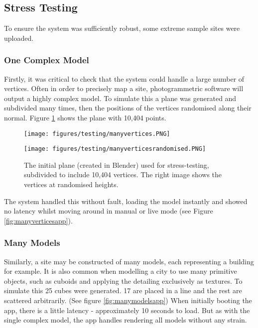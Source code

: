 \documentclass[12pt, a4paper]{article}
\begin{document}
\subsection{Stress Testing}
To ensure the system was sufficiently robust, some extreme sample sites were uploaded.

\subsubsection{One Complex Model}
Firstly, it was critical to check that the system could handle a large number of vertices. Often in order to precisely map a site, photogrammetric software will output a highly complex model. To simulate this a plane was generated and subdivided many times, then the positions of the vertices randomised along their normal. Figure \ref{fig:stressplane} shows the plane with 10,404 points.

\begin{figure}[H]
\centering
\begin{minipage}{.5\textwidth}
  \centering
  \texttt{[image: figures/testing/manyvertices.PNG]}
\end{minipage}%
\begin{minipage}{.5\textwidth}
  \centering
  \texttt{[image: figures/testing/manyverticesrandomised.PNG]}
\end{minipage}
\caption{The initial plane (created in Blender) used for stress-testing, subdivided to include 10,404 vertices. The right image shows the vertices at randomised heights.}
\label{fig:stressplane}
\end{figure}

The system handled this without fault, loading the model instantly and showed no latency whilst moving around in manual or live mode (see Figure \ref{fig:manyverticesapp}). 

\subsubsection{Many Models}
Similarly, a site may be constructed of many models, each representing a building for example. It is also common when modelling a city to use many primitive objects, such as cuboids and applying the detailing exclusively as textures. To simulate this 25 cubes were generated. 17 are placed in a line and the rest are scattered arbitrarily. (See figure \ref{fig:manymodelsapp}) When initially booting the app, there is a little latency - approximately 10 seconds to load. But as with the single complex model, the app handles rendering all models without any strain. 
\end{document}
